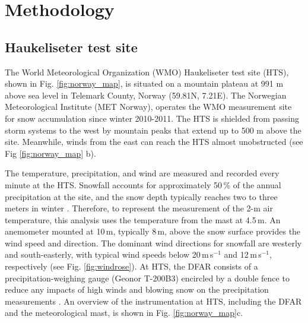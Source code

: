 \documentclass{ametsocV5}
\begin{document}

\section{Methodology}\label{sec:methodology}
	\subsection{Haukeliseter test site}
		The World Meteorological Organization (WMO) Haukeliseter test site (HTS), shown in Fig. \ref{fig:norway_map}, is situated on a mountain plateau at 991 m above sea level in Telemark County, Norway (59.81\textdegree N, 7.21\textdegree E). The Norwegian Meteorological Institute (MET Norway), operates the WMO measurement site for snow accumulation since winter 2010-2011. The HTS is shielded from passing storm systems to the west by mountain peaks that extend up to 500 m above the site. Meanwhile, winds from the east can reach the HTS almost unobstructed (see Fig \ref{fig:norway_map} b).  

		The temperature, precipitation, and wind are measured and recorded every minute at the HTS. Snowfall accounts for approximately 50\,\% of the annual precipitation at the site, and the snow depth typically reaches two to three meters in winter \citep{wolff_derivation_2015}. Therefore, to represent the measurement of the 2-m air temperature, this analysis uses the temperature from the mast at 4.5\,m. An anemometer mounted at 10\,m, typically 8\,m, above the snow surface provides the wind speed and direction. The dominant wind directions for snowfall are westerly and south-easterly, with typical wind speeds below 20\,m\,s$^{-1}$ and 12\,m\,s$^{-1}$, respectively (see Fig. \ref{fig:windrose}). At HTS, the DFAR consists of a precipitation-weighing gauge (Geonor T-200B3) encircled by a double fence to reduce any impacts of high winds and blowing snow on the precipitation measurements \citep{goodison_wmo_1998}. An overview of the instrumentation at HTS, including the DFAR and the meteorological mast, is shown in Fig. \ref{fig:norway_map}c. 
\end{document}
